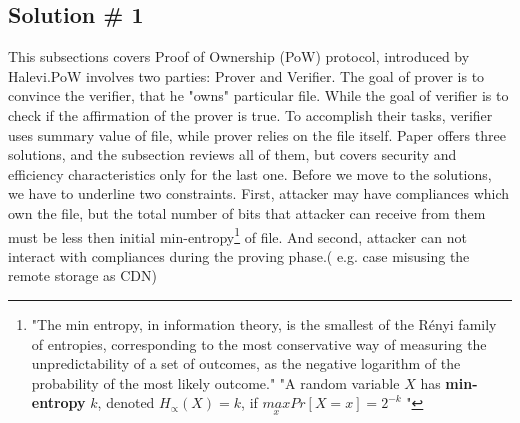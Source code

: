 \documentclass[12pt]{article}
\begin{document}
\subsection{Solution \# 1}
\label{sub:Soltuion1}
This subsections covers Proof of Ownership (PoW) protocol, introduced by Halevi.\cite{PoW}PoW involves two parties: Prover and Verifier. The goal of prover is to convince the verifier, that he "owns" particular file. While the goal of verifier is to check if the affirmation of the prover is true. To accomplish their tasks, verifier uses summary value of file, while  prover relies on  the file itself. Paper \cite{PoW} offers three solutions, and the subsection reviews all of them, but covers security and efficiency characteristics only  for the last one. Before we move to the solutions, we have to underline two constraints. First, attacker may have compliances which own the file, but the total number of bits that attacker can receive from them must be less then initial min-entropy\footnote{"The min entropy, in information theory, is the smallest of the Rényi family of entropies, corresponding to the most conservative way of measuring the unpredictability of a set of outcomes, as the negative logarithm of the probability of the most likely outcome." "A random variable $X$ has \textbf{min-entropy} $k$, denoted $H_\propto(X)=k$, if  $\underset{x}{max}Pr[X=x]=2^{-k}$  "\cite{MinEnt} } of file. And second, attacker can not interact with compliances during the proving phase.( e.g. case misusing the remote storage as CDN)
\end{document}
